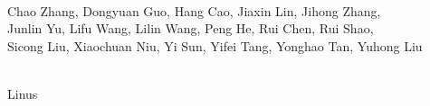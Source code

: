 \documentclass{article} %
\begin{document}
\vspace{0.25cm}

 \\[3pt]
\hspace{1.8em} Chao Zhang, Dongyuan Guo, Hang Cao, Jiaxin Lin, Jihong Zhang, \\
\hspace{1.8em} Junlin Yu, Lifu Wang, Lilin Wang, Peng He, Rui Chen, Rui Shao, \\
\hspace{1.8em} Sicong Liu, Xiaochuan Niu, Yi Sun, Yifei Tang, Yonghao Tan, Yuhong Liu

\vspace{0.4cm}

 \\[4pt]
\hspace{1.2em} Linus

 


\clearpage


\end{document}
